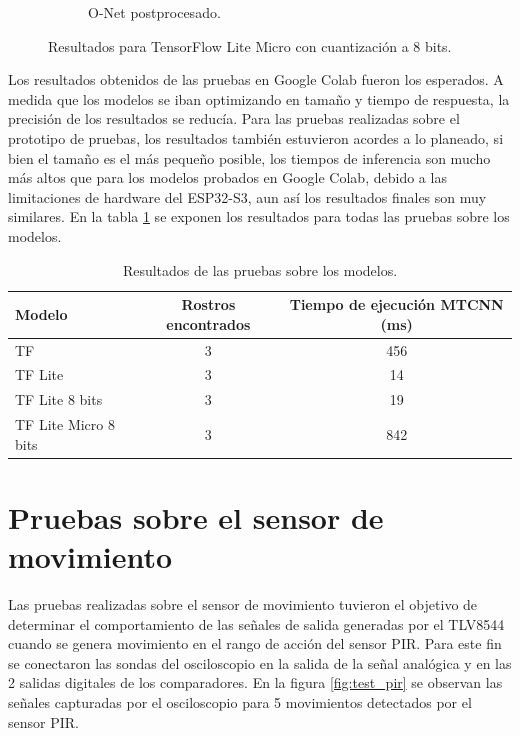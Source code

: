 \begin{figure}[!htpb]
\begin{subfigure}[b]{0.28\textwidth}
         \caption{O-Net postprocesado.}
         \label{fig:2de3}
     \end{subfigure}
     \hfill
        \caption{Resultados para TensorFlow Lite Micro con cuantización a 8 bits.}
        \label{fig:test_tflm}
\end{figure}

Los resultados obtenidos de las pruebas en Google Colab fueron los esperados. A medida que los modelos se iban optimizando en tamaño y tiempo de respuesta, la precisión de los resultados se reducía. Para las pruebas realizadas sobre el prototipo de pruebas, los resultados también estuvieron acordes a lo planeado, si bien el tamaño es el más pequeño posible, los tiempos de inferencia son mucho más altos que para los modelos probados en Google Colab, debido a las limitaciones de hardware del ESP32-S3, aun así los resultados finales son muy similares. En la tabla \ref{tab:test_tf_models} se exponen los resultados para todas las pruebas sobre los modelos.

\begin{table}[h]
	\centering
	\caption[Resultados de las pruebas sobre los modelos]{Resultados de las pruebas sobre los modelos.}
	\begin{tabular}{lcc}   
		\toprule
		\textbf{Modelo} & \textbf{Rostros encontrados} & \textbf{Tiempo de ejecución MTCNN (ms)} \\
		\midrule
		TF & 3 & 456 \\
		TF Lite & 3 & 14 \\
		TF Lite 8 bits & 3 & 19 \\
		TF Lite Micro 8 bits & 3 & 842 \\
		\bottomrule
		\hline
	\end{tabular}
	\label{tab:test_tf_models}
\end{table}

\section{Pruebas sobre el sensor de movimiento}
Las pruebas realizadas sobre el sensor de movimiento tuvieron el objetivo de determinar el comportamiento de las señales de salida generadas por el TLV8544 cuando se genera movimiento en el rango de acción del sensor PIR. Para este fin se conectaron las sondas del osciloscopio en la salida de la señal analógica y en las 2 salidas digitales de los comparadores. En la figura \ref{fig:test_pir} se observan las señales capturadas por el osciloscopio para 5 movimientos detectados por el sensor PIR.

